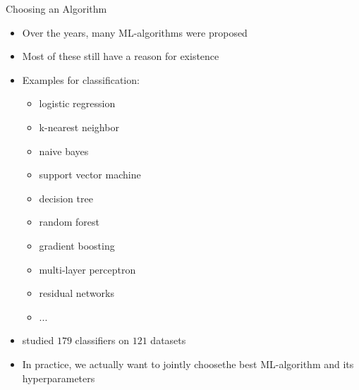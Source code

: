 \begin{frame}[c]{Choosing an Algorithm}

\begin{itemize}
	\item Over the years, many ML-algorithms were proposed
	\pause
	\item Most of these still have a reason for existence
	\pause
	\item Examples for classification:
	\begin{itemize}
		\item logistic regression
		\item k-nearest neighbor
		\item naive bayes
		\item support vector machine
		\item decision tree
		\item random forest
		\item gradient boosting
		\item multi-layer perceptron
		\item residual networks
		\item ...
	\end{itemize}
	\pause
	\item {} studied $179$ classifiers on $121$ datasets
	\pause
	\item In practice, we actually want to jointly choose\newline the best ML-algorithm and its hyperparameters
\end{itemize}


\end{frame}
